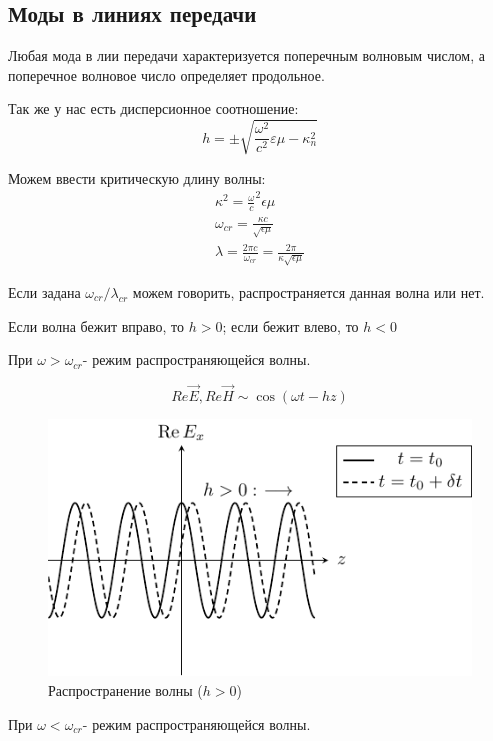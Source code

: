 \subsection{Моды в линиях передачи}
Любая мода в лии передачи характеризуется поперечным волновым числом, а поперечное волновое число определяет продольное.

Так же у нас есть дисперсионное соотношение:
\begin{equation}
	h = \pm \sqrt{\frac{\omega^2}{c^2} \varepsilon \mu -\kappa^2_n}
\end{equation}

Можем ввести критическую длину волны:
\begin{gather}
	\kappa^2 = {\frac{\omega}{c}}^2 {\epsilon \mu}\\
	\omega_{cr} = \frac{\kappa c}{\sqrt{\epsilon \mu}}\\
	\lambda = \frac{2 \pi c}{\omega_{cr}} = \frac{2 \pi}{\kappa \sqrt{\epsilon \mu}}
\end{gather}

Если задана $\omega_{cr} / \lambda_{cr}$ можем говорить, распространяется данная волна или нет.

Если волна бежит вправо, то $h > 0$; если бежит влево, то $h < 0$

При  $\omega > \omega_{cr}$- режим распространяющейся волны.

\begin{equation}
	Re{\vec{E}} , Re{\vec{H}} \sim \cos(\omega t - h z)
\end{equation}

\begin{figure}[H]
	\centering
	\includegraphics[scale=1.5]{img/lect3_ris1}
	\caption{Распространение волны ($h>0$)}
	\label{fig:lect3:1}
\end{figure}
При  $\omega < \omega_{cr}$- режим распространяющейся волны.

